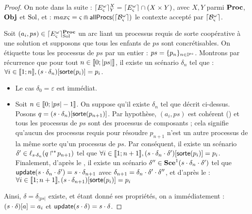 \begin{proof} %
  On note dans la suite :
  $\lceil E_\varsigma^\omega\rceil^{X}_{Y} = \lceil E_\varsigma^\omega\rceil \cap (X \times Y)$, avec $X, Y$ parmi $\mathbf{Proc}$, $\mathbf{Obj}$ et $\mathrm{Sol}$,
  et : $max\varsigma = \varsigma \Cap \mathsf{allProcs}(\lceil \mathcal{B}_\varsigma^\omega\rceil)$ le contexte accepté par $\lceil \mathcal{B}_\varsigma^\omega\rceil$.
  
  Soit $(a_i, ps) \in \lceil E_\varsigma^\omega\rceil^{\mathbf{Proc}}_{\mathrm{Sol}}$ un arc liant un processus requis de sorte coopérative à
  une solution et supposons que tous les enfants de $ps$ sont concrétisables.
  On étiquette tous les processus de $ps$ par un entier : $ps = \{ p_n \}_{n \in \mathbb{I}^{ps}}$.
  Montrons par récurrence que pour tout $n \in \llbracket 0; |ps| \rrbracket$,
  il existe un scénario $\delta_n$ tel que :
  $\forall i \in \llbracket 1; n \rrbracket, {(s \cdot \delta_n)[\mathsf{sorte}(p_i)]} = p_i$.
  \begin{itemize}
    \item Le cas $\delta_0 = \varepsilon$ est immédiat.
    \item Soit $n \in \llbracket 0; |ps| - 1 \rrbracket$.
      On suppose qu'il existe $\delta_n$ tel que décrit ci-dessus.
      Posons $q = {(s \cdot \delta_n)[\mathsf{sorte}(p_{n+1})]}$.
      Par hypothèse, $(a_i, ps)$ est cohérent () et tous les processus
      de $ps$ sont des processus de composants  ;
      cela signifie qu'aucun des processus requis pour résoudre $p_{n+1}$ n'est un autre processus
      de la même sorte qu'un processus de $ps$.
      Par conséquent, il existe un scénario
      $\delta' \in \ell_{s \cdot \delta_n}(\mbox{$q\Rsh^*\!p_{n+1}$})$
      tel que $\forall i \in \llbracket 1; n+1 \rrbracket,
        {(s \cdot \delta_n \cdot \delta')[\mathsf{sorte}(p_{i})]} = p_{i}$.
      Finalement, d'après le , il existe un scénario
      $\delta'' \in \mathbf{Sce}^1(s \cdot \delta_n \cdot \delta')$
      tel que $\mathsf{update}(s \cdot \delta_n \cdot \delta') = s \cdot \delta_{n+1}$
      avec $\delta_{n+1} = \delta_n \cdot \delta' \cdot \delta''$,
      et d'après le  :
      $\forall i \in \llbracket 1; n+1 \rrbracket, {(s \cdot \delta_{n+1})[\mathsf{sorte}(p_i)]} = p_i$
  \end{itemize}
  Ainsi, $\delta = \delta_{|ps|}$ existe, et étant donné ses propriétés, on a immédiatement :
  ${(s \cdot \delta)[a]} = a_i$ et $\mathsf{update}(s \cdot \delta) = s \cdot \delta$.
  

\end{proof}
